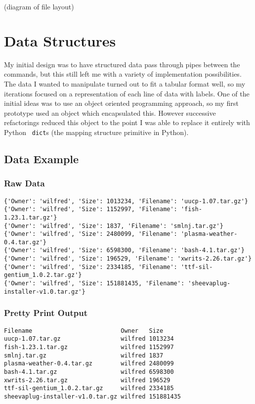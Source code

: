 \documentclass[12pt,twoside,notitlepage]{report}
\begin{document}
(diagram of file layout)

\section{Data Structures}
My initial design was to have structured data pass through pipes between the
commands, but this still left me with a variety of implementation
possibilities. The data I wanted to manipulate turned out to fit a tabular
format well, so my iterations focused on a representation of each line of data
with labels. %
One of the initial ideas was to use an object oriented programming approach, so
my first prototype %
used an object which encapsulated this. However successive refactorings reduced
this object to the point I was able to replace it entirely with Python {\tt
  dict}s (the mapping structure primitive in Python).

\subsection{Data Example}
\subsubsection{Raw Data}
\begin{verbatim}
{'Owner': 'wilfred', 'Size': 1013234, 'Filename': 'uucp-1.07.tar.gz'}
{'Owner': 'wilfred', 'Size': 1152997, 'Filename': 'fish-1.23.1.tar.gz'}
{'Owner': 'wilfred', 'Size': 1837, 'Filename': 'smlnj.tar.gz'}
{'Owner': 'wilfred', 'Size': 2480099, 'Filename': 'plasma-weather-0.4.tar.gz'}
{'Owner': 'wilfred', 'Size': 6598300, 'Filename': 'bash-4.1.tar.gz'}
{'Owner': 'wilfred', 'Size': 196529, 'Filename': 'xwrits-2.26.tar.gz'}
{'Owner': 'wilfred', 'Size': 2334185, 'Filename': 'ttf-sil-gentium_1.0.2.tar.gz'}
{'Owner': 'wilfred', 'Size': 151881435, 'Filename': 'sheevaplug-installer-v1.0.tar.gz'}
\end{verbatim}

\subsubsection{Pretty Print Output}
\begin{verbatim}
Filename                         Owner   Size      
uucp-1.07.tar.gz                 wilfred 1013234   
fish-1.23.1.tar.gz               wilfred 1152997   
smlnj.tar.gz                     wilfred 1837      
plasma-weather-0.4.tar.gz        wilfred 2480099   
bash-4.1.tar.gz                  wilfred 6598300   
xwrits-2.26.tar.gz               wilfred 196529    
ttf-sil-gentium_1.0.2.tar.gz     wilfred 2334185   
sheevaplug-installer-v1.0.tar.gz wilfred 151881435
\end{verbatim}
\end{document}
